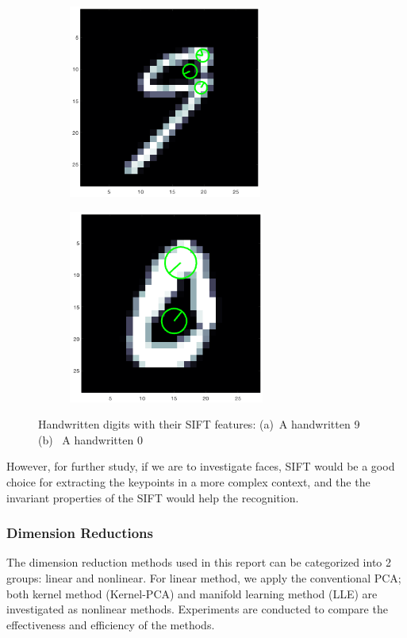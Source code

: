 \documentclass[12pt]{article}
\begin{document}
\begin{figure}[tbp]
	\centering
	\begin{subfigure}{.45\textwidth}
		\includegraphics[height = 2.5in]{SIFT}		
		\caption{ }
	\end{subfigure}
	\begin{subfigure}{.45\textwidth}
		\includegraphics[height = 2.5in]{SIFT_2}		
		\caption{ }
	\end{subfigure}
	\caption{Handwritten digits with their SIFT features: (a)~A handwritten 9 (b)~ A handwritten 0}
	\label{fig:SIFT}
\end{figure}


However, for further study, if we are to investigate faces, SIFT would be a good choice for extracting the keypoints in a more complex context, and the the invariant properties of the SIFT would help the recognition.
 
\subsubsection{Dimension Reductions}
 
The dimension reduction methods used in this report can be categorized into 2 groups: linear and nonlinear. For linear method, we apply the conventional PCA; both kernel method (Kernel-PCA) and manifold learning method (LLE) are investigated as nonlinear methods. Experiments are conducted to compare the effectiveness and efficiency of the methods.
\end{document}
